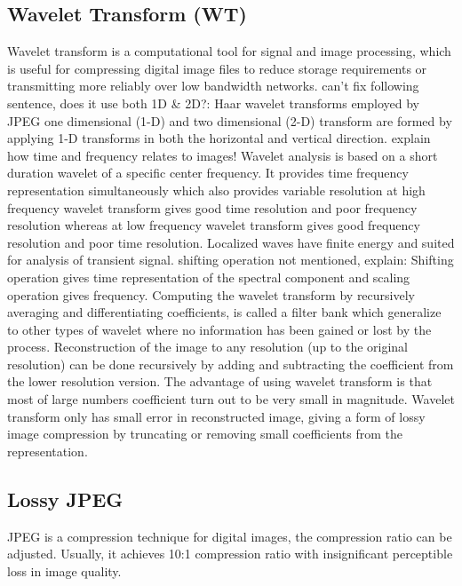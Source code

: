 \subsection{Wavelet Transform (WT)}

Wavelet transform is a computational tool for signal and image processing, which is useful for compressing digital image files to reduce storage requirements or transmitting more reliably over low bandwidth networks. 
{\color{red} can't fix following sentence, does it use both 1D \& 2D?:} {\color{blue}Haar wavelet transforms employed by JPEG one dimensional (1-D) and two dimensional (2-D) transform} are formed by applying 1-D transforms in both the horizontal and vertical direction. 
{\color{red} explain how time and frequency relates to images!} {\color{blue}Wavelet analysis is based on a short duration wavelet of a specific center frequency. 
It provides time frequency representation simultaneously which also provides variable resolution at high frequency wavelet transform gives good time resolution and poor frequency resolution whereas at low frequency wavelet transform gives good frequency resolution and poor time resolution. }
Localized waves have finite energy and suited for analysis of transient signal. 
{\color{red} shifting operation not mentioned, explain:} {\color{blue}Shifting operation gives time representation of the spectral component and scaling operation gives frequency. }
Computing the wavelet transform by recursively averaging and differentiating coefficients, is
called a filter bank which generalize to other types of wavelet where no information has
been gained or lost by the process. 
Reconstruction of the image to any resolution (up to the original resolution) can be done recursively by adding and subtracting the coefficient from the lower resolution version.
The advantage of using wavelet transform is that most of large numbers coefficient
turn out to be very small in magnitude. Wavelet transform only has small error in reconstructed image, giving a form of lossy image compression by truncating or removing small coefficients from
the representation.

\subsection{Lossy JPEG}
JPEG is a compression technique for digital images, the compression ratio can be adjusted. Usually, it achieves 10:1 compression ratio with insignificant perceptible loss in image quality.

